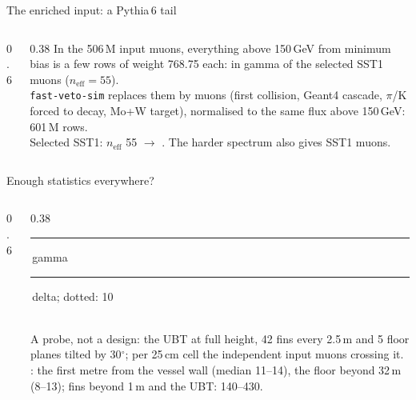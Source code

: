 \documentclass[aspectratio=169,10pt]{beamer}
\newcommand{\legendline}[1]{{\color{muted}\lightfont\scriptsize #1}}
\newcommand{\sw}[1]{\textcolor[HTML]{#1}{\rule{1.1ex}{1.1ex}}}
\begin{document}
\begin{frame}{The enriched input: a Pythia\,6 tail}
  \begin{columns}[c]
    \begin{column}{0.6\textwidth}
    \end{column}
    \begin{column}{0.38\textwidth}\footnotesize
      In the 506\,M input muons, everything above 150\,GeV from minimum bias is a few rows of weight 768.75 each: in gamma  of the selected SST1 muons ($n_\text{eff} = 55$).\\[1.5mm]
      \texttt{fast-veto-sim} replaces them by  muons (first collision, Geant4 cascade, $\pi$/K forced to decay, Mo+W target), normalised to the same flux above 150\,GeV: 601\,M rows.\\[1.5mm]
      Selected SST1: $n_\text{eff}$ 55 $\to$ . The harder spectrum also gives  SST1 muons.\\[1.5mm]
    \end{column}
  \end{columns}
\end{frame}

\begin{frame}{Enough statistics everywhere?}
  \begin{columns}[c]
    \begin{column}{0.6\textwidth}
      \\[1mm]
    \end{column}
    \begin{column}{0.38\textwidth}
      \\[0.3mm]
      \legendline{\sw{5B6475}\,gamma \ \sw{B0352B}\,delta; dotted: 10}\\[0.5mm]
      \footnotesize A probe, not a design: the UBT at full height, 42 fins every 2.5\,m and 5 floor planes tilted by 30$^\circ$; per 25\,cm cell the independent input muons crossing it.\\[1mm]
      : the first metre from the vessel wall (median 11--14), the floor beyond 32\,m (8--13); fins beyond 1\,m and the UBT: 140--430.
    \end{column}
  \end{columns}
\end{frame}
\end{document}
